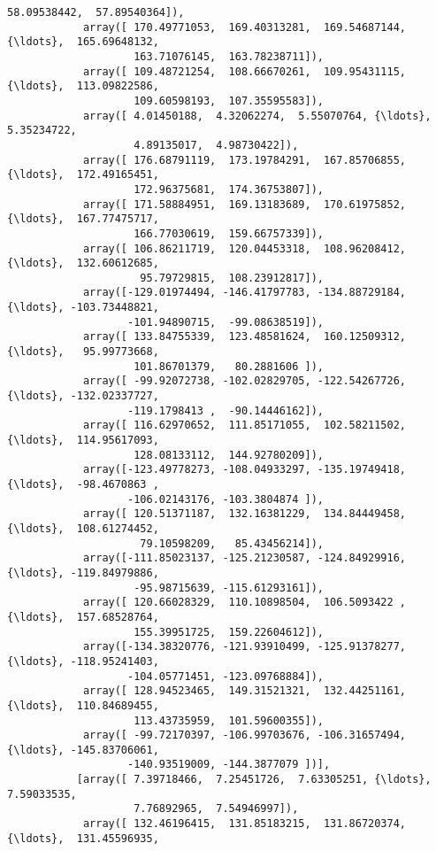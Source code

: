\documentclass[11pt]{article}
\begin{document}
\begin{Verbatim}[commandchars=\\\{\}]
                    58.09538442,  57.89540364]),
            array([ 170.49771053,  169.40313281,  169.54687144, {\ldots},  165.69648132,
                    163.71076145,  163.78238711]),
            array([ 109.48721254,  108.66670261,  109.95431115, {\ldots},  113.09822586,
                    109.60598193,  107.35595583]),
            array([ 4.01450188,  4.32062274,  5.55070764, {\ldots},  5.35234722,
                    4.89135017,  4.98730422]),
            array([ 176.68791119,  173.19784291,  167.85706855, {\ldots},  172.49165451,
                    172.96375681,  174.36753807]),
            array([ 171.58884951,  169.13183689,  170.61975852, {\ldots},  167.77475717,
                    166.77030619,  159.66757339]),
            array([ 106.86211719,  120.04453318,  108.96208412, {\ldots},  132.60612685,
                     95.79729815,  108.23912817]),
            array([-129.01974494, -146.41797783, -134.88729184, {\ldots}, -103.73448821,
                   -101.94890715,  -99.08638519]),
            array([ 133.84755339,  123.48581624,  160.12509312, {\ldots},   95.99773668,
                    101.86701379,   80.2881606 ]),
            array([ -99.92072738, -102.02829705, -122.54267726, {\ldots}, -132.02337727,
                   -119.1798413 ,  -90.14446162]),
            array([ 116.62970652,  111.85171055,  102.58211502, {\ldots},  114.95617093,
                    128.08133112,  144.92780209]),
            array([-123.49778273, -108.04933297, -135.19749418, {\ldots},  -98.4670863 ,
                   -106.02143176, -103.3804874 ]),
            array([ 120.51371187,  132.16381229,  134.84449458, {\ldots},  108.61274452,
                     79.10598209,   85.43456214]),
            array([-111.85023137, -125.21230587, -124.84929916, {\ldots}, -119.84979886,
                    -95.98715639, -115.61293161]),
            array([ 120.66028329,  110.10898504,  106.5093422 , {\ldots},  157.68528764,
                    155.39951725,  159.22604612]),
            array([-134.38320776, -121.93910499, -125.91378277, {\ldots}, -118.95241403,
                   -104.05771451, -123.09768884]),
            array([ 128.94523465,  149.31521321,  132.44251161, {\ldots},  110.84689455,
                    113.43735959,  101.59600355]),
            array([ -99.72170397, -106.99703676, -106.31657494, {\ldots}, -145.83706061,
                   -140.93519009, -144.3877079 ])],
           [array([ 7.39718466,  7.25451726,  7.63305251, {\ldots},  7.59033535,
                    7.76892965,  7.54946997]),
            array([ 132.46196415,  131.85183215,  131.86720374, {\ldots},  131.45596935,

\end{Verbatim}
\end{document}
